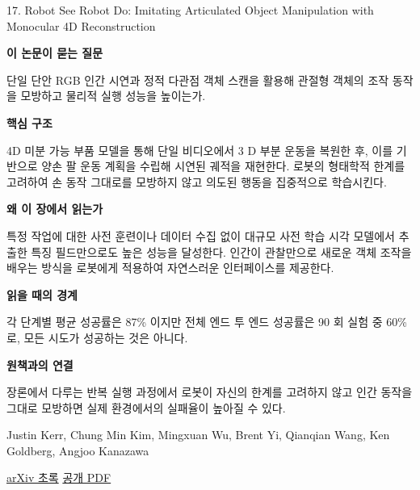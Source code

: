 \documentclass[11pt,openany]{book}
\begin{document}
\begin{termcard}{17. Robot See Robot Do: Imitating Articulated Object Manipulation with Monocular 4D Reconstruction}

\par

\medskip

{\sffamily\bfseries\color{deepblue} 이 논문이 묻는 질문}\par

단일 단안 RGB 인간 시연과 정적 다관점 객체 스캔을 활용해 관절형 객체의 조작 동작을 모방하고 물리적 실행 성능을 높이는가.

\smallskip

{\sffamily\bfseries\color{deepblue} 핵심 구조}\par

4D 미분 가능 부품 모델을 통해 단일 비디오에서 3 D 부분 운동을 복원한 후, 이를 기반으로 양손 팔 운동 계획을 수립해 시연된 궤적을 재현한다. 로봇의 형태학적 한계를 고려하여 손 동작 그대로를 모방하지 않고 의도된 행동을 집중적으로 학습시킨다.

\smallskip

{\sffamily\bfseries\color{deepblue} 왜 이 장에서 읽는가}\par

특정 작업에 대한 사전 훈련이나 데이터 수집 없이 대규모 사전 학습 시각 모델에서 추출한 특징 필드만으로도 높은 성능을 달성한다. 인간이 관찰만으로 새로운 객체 조작을 배우는 방식을 로봇에게 적용하여 자연스러운 인터페이스를 제공한다.

\smallskip

{\sffamily\bfseries\color{coral} 읽을 때의 경계}\par

각 단계별 평균 성공률은 87\% 이지만 전체 엔드 투 엔드 성공률은 90 회 실험 중 60\% 로, 모든 시도가 성공하는 것은 아니다.

\smallskip

{\sffamily\bfseries\color{teal} 원책과의 연결}\par

장론에서 다루는 반복 실행 과정에서 로봇이 자신의 한계를 고려하지 않고 인간 동작을 그대로 모방하면 실제 환경에서의 실패율이 높아질 수 있다.

\medskip

{\footnotesize\color{muted} Justin Kerr, Chung Min Kim, Mingxuan Wu, Brent Yi, Qianqian Wang, Ken Goldberg, Angjoo Kanazawa\par

\href{https://arxiv.org/abs/2409.18121}{arXiv 초록} \quad \href{https://arxiv.org/pdf/2409.18121}{공개 PDF}\par}

\end{termcard}
\end{document}
